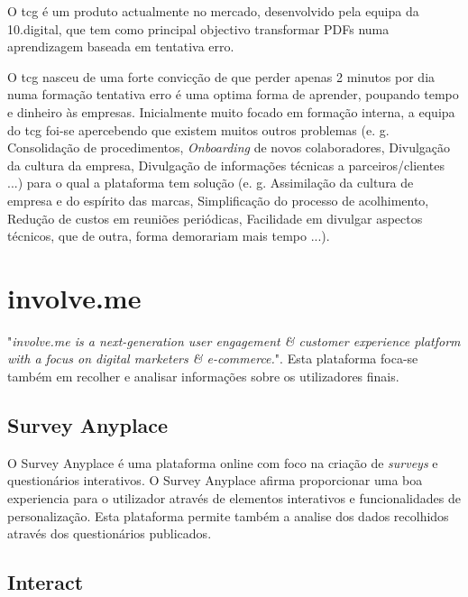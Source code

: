 O \acrlong{tcg} é um produto actualmente no mercado, desenvolvido pela equipa da 10.digital, que tem como principal objectivo transformar PDFs numa aprendizagem baseada em tentativa erro.

 O \acrshort{tcg} nasceu de uma forte convicção de que perder apenas 2 minutos por dia numa formação tentativa erro é uma optima forma de aprender, poupando tempo e dinheiro às empresas. Inicialmente muito focado em formação interna, a equipa do \acrshort{tcg} foi-se apercebendo que existem muitos outros problemas (e. g. Consolidação de procedimentos, \textit{Onboarding} de novos colaboradores, Divulgação da cultura da empresa, Divulgação de informações técnicas a parceiros/clientes ...) para o qual a plataforma tem solução (e. g. Assimilação da cultura de empresa e do espírito das marcas, Simplificação do processo de acolhimento, Redução de custos em reuniões periódicas, Facilidade em divulgar aspectos técnicos, que de outra, forma demorariam mais tempo ...).\cite{tcginfo}



\section{involve.me}
\label{involvemeM}


"\textit{involve.me is a next-generation user engagement \& customer experience platform with a focus on digital marketers \& e-commerce.}"\cite{involve}.
Esta plataforma foca-se também em recolher e analisar informações sobre os utilizadores finais.

\subsection{Survey Anyplace}
\label{surveyanyplaceM}




O Survey Anyplace é uma plataforma online com foco na criação de \textit{surveys} e questionários interativos. O Survey Anyplace afirma proporcionar uma boa experiencia para o utilizador através de elementos interativos e funcionalidades de personalização. Esta plataforma permite também a analise dos dados recolhidos através dos questionários publicados.


\subsection{Interact}
\label{interactM}


